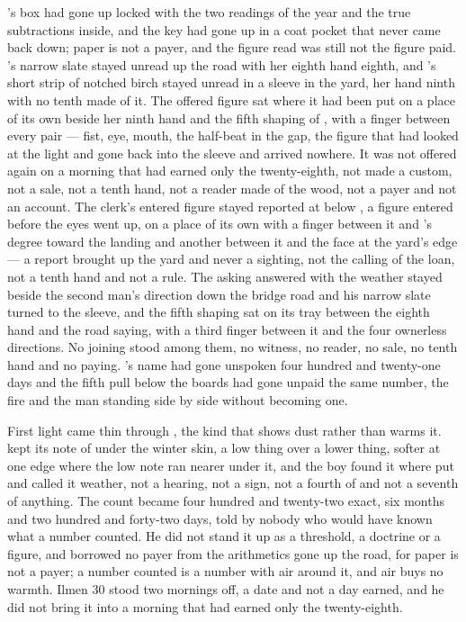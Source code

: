 's box had gone up  locked with the two readings of the year and the true subtractions inside, and the key had gone up in a coat pocket that never came back down; paper is not a payer, and the figure read was still not the figure paid. 's narrow slate stayed unread up the road with her eighth hand eighth, and 's short strip of notched birch stayed unread in a sleeve in the yard, her hand ninth with no tenth made of it. The offered figure sat where it had been put on a place of its own beside her ninth hand and the fifth shaping of , with a finger between every pair --- fist, eye, mouth, the half-beat in the gap, the figure that had looked at the light and gone back into the sleeve and arrived nowhere. It was not offered again on a morning that had earned only the twenty-eighth, not made a custom, not a sale, not a tenth hand, not a reader made of the wood, not a payer and not an account. The clerk's entered figure stayed reported at  below , a figure entered before the eyes went up, on a place of its own with a finger between it and 's degree toward the landing and another between it and the face at the yard's edge --- a report brought up the yard and never a sighting, not the calling of the loan, not a tenth hand and not a rule. The asking answered with the weather stayed beside the second man's direction down the bridge road and his narrow slate turned to the sleeve, and the fifth shaping sat on its tray between the eighth hand and the road saying, with a third finger between it and the four ownerless directions. No joining stood among them, no witness, no reader, no sale, no tenth hand and no paying. 's name had gone unspoken four hundred and twenty-one days and the fifth pull below the boards had gone unpaid the same number, the fire and the man standing side by side without becoming one.

First light came thin through , the kind that shows dust rather than warms it.  kept its note of  under the winter skin, a low thing over a lower thing, softer at one edge where the low note ran nearer under it, and the boy found it where put and called it weather, not a hearing, not a sign, not a fourth of  and not a seventh of anything. The count became four hundred and twenty-two exact, six months and two hundred and forty-two days, told by nobody who would have known what a number counted. He did not stand it up as a threshold, a doctrine or a figure, and borrowed no payer from the arithmetics gone up the road, for paper is not a payer; a number counted is a number with air around it, and air buys no warmth. Ilmen 30 stood two mornings off, a date and not a day earned, and he did not bring it into a morning that had earned only the twenty-eighth.

